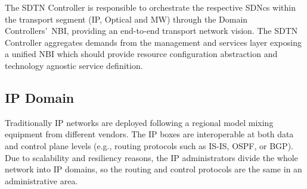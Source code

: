 \documentclass[10pt, conference]{IEEEtran}
\begin{document}
The SDTN Controller is responsible to orchestrate the respective SDNcs within the transport segment (IP, Optical and MW) through the Domain Controllers'~NBI, providing an end-to-end transport network vision. The SDTN Controller aggregates demands from the management and services layer exposing a unified NBI which should provide resource configuration abstraction and technology agnostic service definition. 



\subsection {IP Domain}
\label{section:ip}
Traditionally IP networks are deployed following a regional model mixing equipment from different vendors. The IP boxes are interoperable at both data and control plane levels (e.g., routing protocols such as IS-IS, OSPF, or BGP). Due to scalability and resiliency reasons, the IP administrators divide the whole network into IP domains, so the routing and control protocols are the same in an administrative area.
\end{document}
